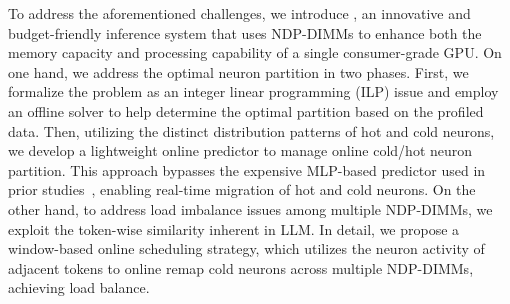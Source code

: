 
To address the aforementioned challenges, we introduce \name, an innovative and budget-friendly inference system that uses NDP-DIMMs to enhance both the memory capacity and processing capability of a single consumer-grade GPU. On one hand, we address the optimal neuron partition in two phases. First, we formalize the problem as an integer linear programming (ILP) issue and employ an offline solver to help determine the optimal partition based on the profiled data. Then, utilizing the distinct distribution patterns of hot and cold neurons, we develop a lightweight online predictor to manage online cold/hot neuron partition. This approach bypasses the expensive MLP-based predictor used in prior studies~\cite{song2024prosparse, song2024turbo, xue2024powerinfer}, enabling real-time migration of hot and cold neurons. On the other hand, to address load imbalance issues among multiple NDP-DIMMs, we exploit the token-wise similarity inherent in LLM. In detail, we propose a window-based online scheduling strategy, which utilizes the neuron activity of adjacent tokens to online remap cold neurons across multiple NDP-DIMMs, achieving load balance.



